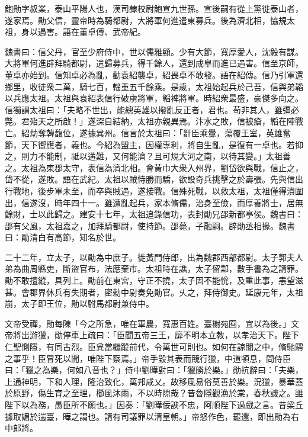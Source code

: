 
\begin{pinyinscope}
鮑勛字叔業，泰山平陽人也，漢司隷校尉鮑宣九世孫。宣後嗣有從上黨徙泰山者，遂家焉。勛父信，靈帝時為騎都尉，大將軍何進遣東募兵。後為濟北相，恊規太祖，身以遇害。語在董卓傳、武帝紀。

魏書曰：信父丹，官至少府侍中，世以儒雅顯。少有大節，寬厚愛人，沈毅有謀。大將軍何進辟拜騎都尉，遣歸募兵，得千餘人，還到成皐而進已遇害。信至京師，董卓亦始到。信知卓必為亂，勸袁紹襲卓，紹畏卓不敢發。語在紹傳。信乃引軍還鄉里，收徒衆二萬，騎七百，輜重五千餘乘。是歲，太祖始起兵於己吾，信與弟韜以兵應太祖。太祖與袁紹表信行破虜將軍，韜裨將軍。時紹衆最盛，豪傑多向之。信獨謂太祖曰：「夫略不世出，能總英雄以撥亂反正者，君也。苟非其人，雖彊必斃。君殆天之所啟！」遂深自結納，太祖亦親異焉。汴水之敗，信被瘡，韜在陣戰亡。紹劫奪韓馥位，遂據兾州。信言於太祖曰：「姧臣乘釁，蕩覆王室，英雄奮節，天下嚮應者，義也。今紹為盟主，因權專利，將自生亂，是復有一卓也。若抑之，則力不能制，祗以遘難，又何能濟？且可規大河之南，以待其變。」太祖善之。太祖為東郡太守，表信為濟北相。會黃巾大衆入州界，劉岱欲與戰，信止之，岱不從，遂敗。語在武紀。太祖以賊恃勝而驕，欲設奇兵挑擊之於壽張。先與信出行戰地，後步軍未至，而卒與賊遇，遂接戰。信殊死戰，以救太祖，太祖僅得潰圍出，信遂沒，時年四十一。雖遭亂起兵，家本脩儒，治身至儉，而厚養將士，居無餘財，士以此歸之。建安十七年，太祖追錄信功，表封勛兄邵新都亭侯。魏書曰：邵有父風，太祖嘉之，加拜騎都尉，使持節。邵薨，子融嗣。辟勛丞相掾。魏書曰：勛清白有高節，知名於世。

二十二年，立太子，以勛為中庶子。徙黃門侍郎，出為魏郡西部都尉。太子郭夫人弟為曲周縣吏，斷盜官布，法應棄市。太祖時在譙，太子留鄴，數手書為之請罪。勛不敢擅縱，具列上。勛前在東宮，守正不撓，太子固不能恱，及重此事，恚望滋甚。會郡界休兵有失期者，密勑中尉奏免勛官。乆之，拜侍御史。延康元年，太祖崩，太子即王位，勛以駙馬都尉兼侍中。

文帝受禪，勛每陳「今之所急，唯在軍農，寬惠百姓。臺榭苑囿，宜以為後。」文帝將出游獵，勛停車上疏曰：「臣聞五帝三王，靡不明本立教，以孝治天下。陛下仁聖惻隱，有同古烈。臣兾當繼蹤前代，令萬世可則也。如何在諒闇之中，脩馳騁之事乎！臣冒死以聞，唯陛下察焉。」帝手毀其表而競行獵，中道頓息，問侍臣曰：「獵之為樂，何如八音也？」侍中劉曄對曰：「獵勝於樂。」勛抗辭曰：「夫樂，上通神明，下和人理，隆治致化，萬邦咸乂。故移風易俗莫善於樂。況獵，暴華蓋於原野，傷生育之至理，櫛風沐雨，不以時隙哉？昔魯隱觀漁於棠，春秋譏之。雖陛下以為務，愚臣所不願也。」因奏：「劉曄佞諛不忠，阿順陛下過戲之言。昔梁丘據取媚於遄臺，曄之謂也。請有司議罪以清皇朝。」帝怒作色，罷還，即出勛為右中郎將。


\end{pinyinscope}
